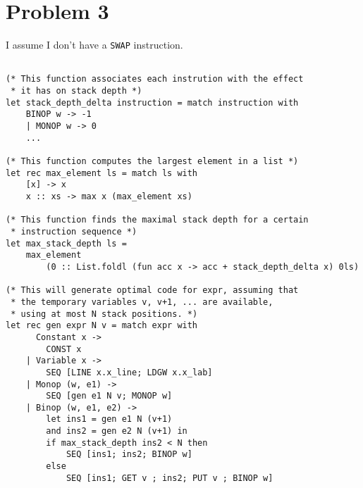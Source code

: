 \section{Problem 3}
I assume I don't have a \texttt{SWAP} instruction.

\begin{lstlisting}[language=Ml]

(* This function associates each instrution with the effect
 * it has on stack depth *)
let stack_depth_delta instruction = match instruction with
    BINOP w -> -1
    | MONOP w -> 0
    ...

(* This function computes the largest element in a list *)
let rec max_element ls = match ls with
    [x] -> x
    x :: xs -> max x (max_element xs)

(* This function finds the maximal stack depth for a certain
 * instruction sequence *)
let max_stack_depth ls =
    max_element
        (0 :: List.foldl (fun acc x -> acc + stack_depth_delta x) 0ls)

(* This will generate optimal code for expr, assuming that
 * the temporary variables v, v+1, ... are available,
 * using at most N stack positions. *)
let rec gen expr N v = match expr with
      Constant x ->
        CONST x
    | Variable x ->
        SEQ [LINE x.x_line; LDGW x.x_lab]
    | Monop (w, e1) ->
        SEQ [gen e1 N v; MONOP w]
    | Binop (w, e1, e2) ->
        let ins1 = gen e1 N (v+1)
        and ins2 = gen e2 N (v+1) in
        if max_stack_depth ins2 < N then
            SEQ [ins1; ins2; BINOP w]
        else
            SEQ [ins1; GET v ; ins2; PUT v ; BINOP w]

\end{lstlisting}
